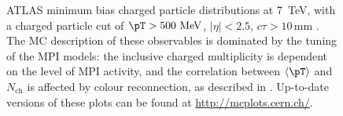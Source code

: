 \begin{figure}[tp]
  \caption{ATLAS minimum bias charged particle distributions at 7~TeV,
    with a charged particle \pT cut of $\pT > 500~\text{MeV}$,
    $|\eta| < 2.5$, $c\tau > 10\,\text{mm}$
    \cite{Atlas:2010xx}. The MC description of these observables is
    dominated by the tuning of the MPI models: the inclusive charged
    multiplicity is dependent on the level of MPI activity, and the
    correlation between $\langle \pT \rangle$ and $N_\text{ch}$ is
    affected by colour reconnection, as described in
    . Up-to-date versions of these plots
    can be found at \url{http://mcplots.cern.ch/}.}
  \label{fig:cmp:mpi-minbias}
\end{figure}

\begin{figure}[tp]
  \centering

\end{figure}
